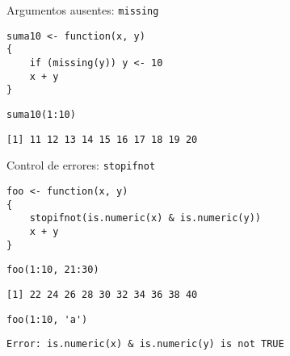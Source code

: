 \documentclass[xcolor={usenames,svgnames,dvipsnames}]{beamer}
\begin{document}
\begin{frame}[fragile,label={sec:org86e5780}]{Argumentos ausentes: \texttt{missing}}
 \lstset{language=r,label= ,caption= ,captionpos=b,numbers=none}
\begin{lstlisting}
suma10 <- function(x, y)
{
    if (missing(y)) y <- 10
    x + y
}
\end{lstlisting}

\lstset{language=r,label= ,caption= ,captionpos=b,numbers=none}
\begin{lstlisting}
suma10(1:10)
\end{lstlisting}

\begin{verbatim}
[1] 11 12 13 14 15 16 17 18 19 20
\end{verbatim}
\end{frame}

\begin{frame}[fragile,label={sec:org1e12cc9}]{Control de errores: \texttt{stopifnot}}
 \lstset{language=r,label= ,caption= ,captionpos=b,numbers=none}
\begin{lstlisting}
foo <- function(x, y)
{
    stopifnot(is.numeric(x) & is.numeric(y))
    x + y
}
\end{lstlisting}

\lstset{language=r,label= ,caption= ,captionpos=b,numbers=none}
\begin{lstlisting}
foo(1:10, 21:30)
\end{lstlisting}

\begin{verbatim}
[1] 22 24 26 28 30 32 34 36 38 40
\end{verbatim}

\lstset{language=r,label= ,caption= ,captionpos=b,numbers=none}
\begin{lstlisting}
foo(1:10, 'a')
\end{lstlisting}

\begin{verbatim}
Error: is.numeric(x) & is.numeric(y) is not TRUE
\end{verbatim}
\end{frame}
\end{document}
